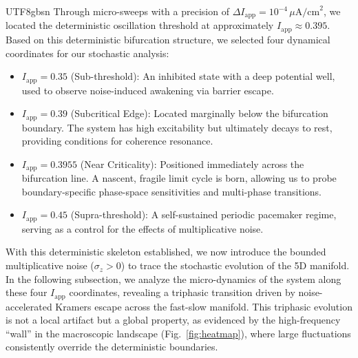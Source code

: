 ﻿\documentclass[reprint, amsmath, amssymb, aps, pre]{revtex4-2}
\begin{document}
\begin{CJK*}{UTF8}{gbsn}
Through micro-sweeps with a precision of $\Delta I_{\mathrm{app}} = 10^{-4} \, \mu\mathrm{A/cm}^2$, we located the deterministic oscillation threshold at approximately $I_{\mathrm{app}} \approx 0.395$. Based on this deterministic bifurcation structure, we selected four dynamical coordinates for our stochastic analysis:

\begin{itemize}
    \item $I_{\mathrm{app}} = 0.35$ (Sub-threshold): An inhibited state with a deep potential well, used to observe noise-induced awakening via barrier escape.
    \item $I_{\mathrm{app}} = 0.39$ (Subcritical Edge): Located marginally below the bifurcation boundary. The system has high excitability but ultimately decays to rest, providing conditions for coherence resonance.
    \item $I_{\mathrm{app}} = 0.3955$ (Near Criticality): Positioned immediately across the bifurcation line. A nascent, fragile limit cycle is born, allowing us to probe boundary-specific phase-space sensitivities and multi-phase transitions.
    \item $I_{\mathrm{app}} = 0.45$ (Supra-threshold): A self-sustained periodic pacemaker regime, serving as a control for the effects of multiplicative noise.
\end{itemize}

With this deterministic skeleton established, we now introduce the bounded multiplicative noise ($\sigma_z > 0$) to trace the stochastic evolution of the 5D manifold. In the following subsection, we analyze the micro-dynamics of the system along these four $I_{\mathrm{app}}$ coordinates, revealing a triphasic transition driven by noise-accelerated Kramers escape across the fast-slow manifold. This triphasic evolution is not a local artifact but a global property, as evidenced by the high-frequency ``wall'' in the macroscopic landscape (Fig.~\ref{fig:heatmap}), where large fluctuations consistently override the deterministic boundaries.


\end{CJK*}
\end{document}

